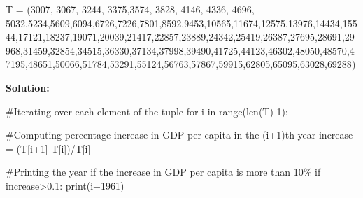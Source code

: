 \documentclass[
  letterpaper,
  DIV=11,
  numbers=noendperiod]{scrreprt}
\newenvironment{Shaded}{\begin{snugshade}}{\end{snugshade}}
\newcommand{\BuiltInTok}[1]{\textcolor[rgb]{0.00,0.23,0.31}{#1}}
\newcommand{\CommentTok}[1]{\textcolor[rgb]{0.37,0.37,0.37}{#1}}
\newcommand{\ControlFlowTok}[1]{\textcolor[rgb]{0.00,0.23,0.31}{#1}}
\newcommand{\DecValTok}[1]{\textcolor[rgb]{0.68,0.00,0.00}{#1}}
\newcommand{\FloatTok}[1]{\textcolor[rgb]{0.68,0.00,0.00}{#1}}
\newcommand{\KeywordTok}[1]{\textcolor[rgb]{0.00,0.23,0.31}{#1}}
\newcommand{\NormalTok}[1]{\textcolor[rgb]{0.00,0.23,0.31}{#1}}
\newcommand{\OperatorTok}[1]{\textcolor[rgb]{0.37,0.37,0.37}{#1}}
\begin{document}
\begin{Shaded}
\begin{Highlighting}[]
\NormalTok{T }\OperatorTok{=}\NormalTok{ (}\DecValTok{3007}\NormalTok{, }\DecValTok{3067}\NormalTok{, }\DecValTok{3244}\NormalTok{, }\DecValTok{3375}\NormalTok{,}\DecValTok{3574}\NormalTok{, }\DecValTok{3828}\NormalTok{, }\DecValTok{4146}\NormalTok{, }\DecValTok{4336}\NormalTok{, }\DecValTok{4696}\NormalTok{, }\DecValTok{5032}\NormalTok{,}\DecValTok{5234}\NormalTok{,}\DecValTok{5609}\NormalTok{,}\DecValTok{6094}\NormalTok{,}\DecValTok{6726}\NormalTok{,}\DecValTok{7226}\NormalTok{,}\DecValTok{7801}\NormalTok{,}\DecValTok{8592}\NormalTok{,}\DecValTok{9453}\NormalTok{,}\DecValTok{10565}\NormalTok{,}\DecValTok{11674}\NormalTok{,}\DecValTok{12575}\NormalTok{,}\DecValTok{13976}\NormalTok{,}\DecValTok{14434}\NormalTok{,}\DecValTok{15544}\NormalTok{,}\DecValTok{17121}\NormalTok{,}\DecValTok{18237}\NormalTok{,}\DecValTok{19071}\NormalTok{,}\DecValTok{20039}\NormalTok{,}\DecValTok{21417}\NormalTok{,}\DecValTok{22857}\NormalTok{,}\DecValTok{23889}\NormalTok{,}\DecValTok{24342}\NormalTok{,}\DecValTok{25419}\NormalTok{,}\DecValTok{26387}\NormalTok{,}\DecValTok{27695}\NormalTok{,}\DecValTok{28691}\NormalTok{,}\DecValTok{29968}\NormalTok{,}\DecValTok{31459}\NormalTok{,}\DecValTok{32854}\NormalTok{,}\DecValTok{34515}\NormalTok{,}\DecValTok{36330}\NormalTok{,}\DecValTok{37134}\NormalTok{,}\DecValTok{37998}\NormalTok{,}\DecValTok{39490}\NormalTok{,}\DecValTok{41725}\NormalTok{,}\DecValTok{44123}\NormalTok{,}\DecValTok{46302}\NormalTok{,}\DecValTok{48050}\NormalTok{,}\DecValTok{48570}\NormalTok{,}\DecValTok{47195}\NormalTok{,}\DecValTok{48651}\NormalTok{,}\DecValTok{50066}\NormalTok{,}\DecValTok{51784}\NormalTok{,}\DecValTok{53291}\NormalTok{,}\DecValTok{55124}\NormalTok{,}\DecValTok{56763}\NormalTok{,}\DecValTok{57867}\NormalTok{,}\DecValTok{59915}\NormalTok{,}\DecValTok{62805}\NormalTok{,}\DecValTok{65095}\NormalTok{,}\DecValTok{63028}\NormalTok{,}\DecValTok{69288}\NormalTok{)}
\end{Highlighting}
\end{Shaded}

\textbf{Solution:}

\begin{Shaded}
\begin{Highlighting}[]
\CommentTok{\#Iterating over each element of the tuple}
\ControlFlowTok{for}\NormalTok{ i }\KeywordTok{in} \BuiltInTok{range}\NormalTok{(}\BuiltInTok{len}\NormalTok{(T)}\OperatorTok{{-}}\DecValTok{1}\NormalTok{):}
    
    \CommentTok{\#Computing percentage increase in GDP per capita in the (i+1)th year}
\NormalTok{    increase }\OperatorTok{=}\NormalTok{ (T[i}\OperatorTok{+}\DecValTok{1}\NormalTok{]}\OperatorTok{{-}}\NormalTok{T[i])}\OperatorTok{/}\NormalTok{T[i]}
    
    \CommentTok{\#Printing the year if the increase in GDP per capita is more than 10\%}
    \ControlFlowTok{if}\NormalTok{ increase}\OperatorTok{\textgreater{}}\FloatTok{0.1}\NormalTok{:}
        \BuiltInTok{print}\NormalTok{(i}\OperatorTok{+}\DecValTok{1961}\NormalTok{)}
\end{Highlighting}
\end{Shaded}
\end{document}

